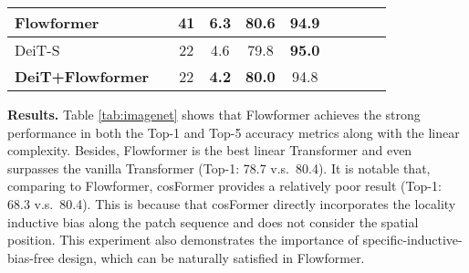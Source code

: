 \documentclass[nohyperref]{article}
\theoremstyle{plain}
\theoremstyle{definition}
\theoremstyle{remark}
\begin{document}
\begin{table}[h]
\begin{small}
\begin{sc}
{\begin{tabular}{l|ccc|cccccc}
			    \textbf{Flowformer} & \scalebox{0.9}{$\mathcal{O}(nd^2)$} &41 & 6.3 & \textbf{80.6} & \textbf{94.9} \\
				\midrule
				DeiT-S \citeyearpar{Touvron2021TrainingDI} & \scalebox{0.9}{$\mathcal{O}(n^2d)$} & 22 & 4.6 & 79.8 & \textbf{95.0} \\
				\textbf{DeiT+Flowformer} & \scalebox{0.9}{$\mathcal{O}(nd^2)$} & 22 & \textbf{4.2} & \textbf{80.0} & 94.8 \\
				\bottomrule
			\end{tabular}}
		\end{sc}
	\end{small}
\end{table}

\textbf{Results.} 
Table \ref{tab:imagenet} shows that Flowformer achieves the strong performance in both the Top-1 and Top-5 accuracy metrics along with the linear complexity. Besides, Flowformer is the best linear Transformer and even surpasses the vanilla Transformer (Top-1: 78.7 v.s.~80.4). It is notable that, comparing to Flowformer, cosFormer \cite{anonymous2022cosformer} provides a relatively poor result (Top-1: 68.3 v.s.~80.4). This is because that cosFormer directly incorporates the locality inductive bias along the patch sequence and does not consider the spatial position.
This experiment also demonstrates the importance of specific-inductive-bias-free design, which can be naturally satisfied in Flowformer.
\end{document}
